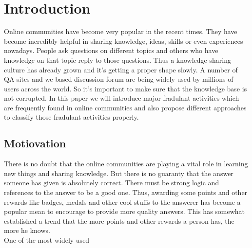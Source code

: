 \chapter{Introduction}
Online communities have become very popular in the recent times. They have become incredibly helpful in sharing knowledge, ideas, skills or even experiences nowadays. People ask questions on different topics and others who have knowledge on that topic reply to those questions. Thus a knowledge sharing culture has already grown and it's getting a proper shape slowly. A number of QA sites and we based discussion forum are being widely used by millions of users across the world. So it's important to make sure that the knowledge base is not corrupted. In this paper we will introduce major fradulant activities which are frequently found in online communities and also propose different approaches to classify those fradulant activities properly. 


\section{Motiovation}
There is no doubt that the online communities are playing a vital role in learning new things and sharing knowledge. But there is no guaranty that the answer someone has given is absolutely correct. There must be strong logic and references to the answer to be a good one. Thus, awarding some points and other rewards like badges, medals and other cool stuffs to the answerer has become a popular mean to encourage to provide more quality answers. This has somewhat established a trend that the more points and other rewards a person has, the more he knows. 
\\
One of the most widely used 

